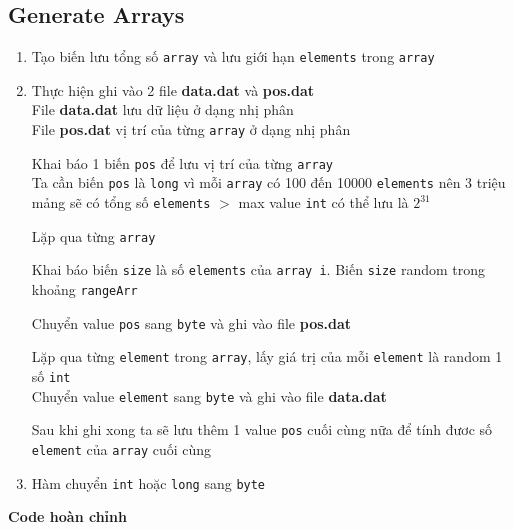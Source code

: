 \documentclass[a4paper]{article}
\theoremstyle{definition}
\begin{document}
\subsection{Generate Arrays}
\begin{enumerate}[1.]
  \item Tạo biến lưu tổng số \texttt{array} và lưu giới hạn \texttt{elements} trong \texttt{array}
  
  \item Thực hiện ghi vào 2 file \textbf{data.dat} và \textbf{pos.dat}\\
  File \textbf{data.dat} lưu dữ liệu ở dạng nhị phân\\
  File \textbf{pos.dat} vị trí của từng \texttt{array} ở dạng nhị phân
  
  Khai báo 1 biến \texttt{pos} để lưu vị trí của từng \texttt{array}\\
  Ta cần biến \texttt{pos} là \texttt{long} vì mỗi \texttt{array} có 100 đến 10000 \texttt{elements} nên 3 triệu mảng sẽ có tổng số \texttt{elements} $>$ max value \texttt{int} có thể lưu là $2^{31}$
  
  Lặp qua từng \texttt{array}
  
  Khai báo biến \texttt{size} là số \texttt{elements} của \texttt{array i}. Biến \texttt{size} random trong khoảng \texttt{rangeArr}
  
  Chuyển value \texttt{pos} sang \texttt{byte} và ghi vào file \textbf{pos.dat}
  
  Lặp qua từng \texttt{element} trong \texttt{array}, lấy giá trị của mỗi \texttt{element} là random 1 số \texttt{int}\\
  Chuyển value \texttt{element} sang \texttt{byte} và ghi vào file \textbf{data.dat}
  
  Sau khi ghi xong ta sẽ lưu thêm 1 value \texttt{pos} cuối cùng nữa để tính đươc số \texttt{element} của \texttt{array} cuối cùng
  

  \item Hàm chuyển \texttt{int} hoặc \texttt{long} sang \texttt{byte}
  
\end{enumerate}
\textbf{Code hoàn chỉnh}
  
\end{document}
